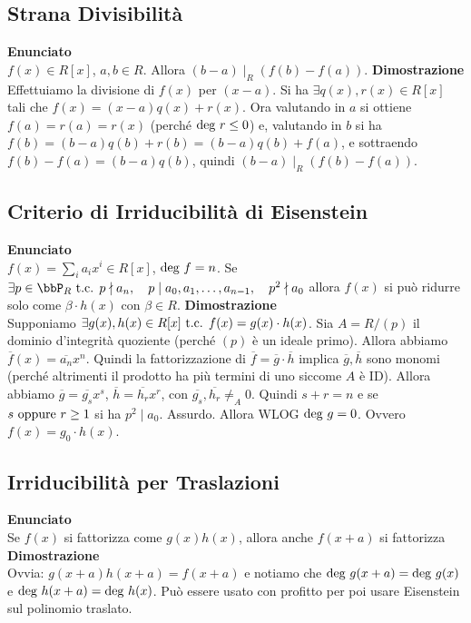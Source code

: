 \documentclass[a4paper,NoNotes,GeneralMath]{stdmdoc}
\newcommand{\Enunciato}{\vskip 0.05cm \noindent \textbf{Enunciato} \\ }
\renewcommand{\Dimostrazione}{\vskip 0.05cm \noindent \textbf{Dimostrazione} \\ }
\renewcommand{\bar}{\overline}
\begin{document}
	\subsection{Strana Divisibilità}
	\Enunciato $f(x) \in R[x]$, $a, b \in R$. Allora $(b-a) \mid_R (f(b) - f(a))$.
	\Dimostrazione Effettuiamo la divisione di $f(x)$ per $(x-a)$. Si ha $\exists q(x), r(x) \in R[x]$ tali che $f(x) = (x-a)q(x) + r(x)$. Ora valutando in $a$ si ottiene $f(a) = r(a) = r(x)$ (perché $\mbox{deg } r \le 0$) e, valutando in $b$ si ha $f(b) = (b-a)q(b) + r(b) = (b-a)q(b) + f(a)$, e sottraendo $f(b)-f(a) = (b-a) q(b)$, quindi $(b-a) \mid_R (f(b)-f(a))$.

	\subsection{Criterio di Irriducibilità di Eisenstein}
	\Enunciato $f(x) = \sum_i a_i x^i \in R[x]$, $\mbox{deg } f = n$. Se $\exists p \in \bbP_R \tc p \nmid a_n, \quad p \mid a_0, a_1, \ldots, a_{n-1}, \quad p^2 \nmid a_0$ allora $f(x)$ si può ridurre solo come $\beta \cdot h(x)$ con $\beta \in R$.
	\Dimostrazione Supponiamo $\exists g(x), h(x) \in R[x] \mbox{ t.c. } f(x) = g(x) \cdot h(x)$. Sia $A = R/(p)$ il dominio d'integrità quoziente (perché $(p)$ è un ideale primo). Allora abbiamo $\bar{f}(x) = \bar{a_n}x^n$. Quindi la fattorizzazione di $\bar{f} = \bar{g} \cdot \bar{h}$ implica $\bar{g}, \bar{h}$ sono monomi (perché altrimenti il prodotto ha più termini di uno siccome $A$ è ID). Allora abbiamo $\bar{g} = \bar{g_s}x^s$, $\bar{h} = \bar{h_r}x^r$, con $\bar{g_s}, \bar{h_r} \neq_A 0$. Quindi $s+r = n$ e se $s \text{ oppure } r \ge 1$ si ha $p^2 \mid a_0$. Assurdo. Allora WLOG $\mbox{deg } g = 0$. Ovvero $f(x) = g_0 \cdot h(x)$.

	\subsection{Irriducibilità per Traslazioni}
	\Enunciato Se $f(x)$ si fattorizza come $g(x)h(x)$, allora anche $f(x+a)$ si fattorizza
	\Dimostrazione Ovvia: $g(x+a)h(x+a) = f(x+a)$ e notiamo che $\mbox{deg } g(x+a) = \mbox{deg } g(x)$ e $\mbox{deg } h(x+a) = \mbox{deg } h(x)$. Può essere usato con profitto per poi usare Eisenstein sul polinomio traslato.
\end{document}
